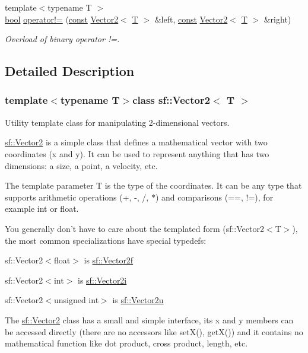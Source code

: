 \begin{DoxyCompactItemize}
{\footnotesize template$<$typename T $>$ }\\\hyperlink{term__entry_8h_a002004ba5d663f149f6c38064926abac}{bool} \hyperlink{classsf_1_1_vector2_a01673da35ef9c52d0e54b8263549a956}{operator!=} (\hyperlink{term__entry_8h_a57bd63ce7f9a353488880e3de6692d5a}{const} \hyperlink{classsf_1_1_vector2}{Vector2}$<$ \hyperlink{curses_8priv_8h_a5ef253115820acf7d27f3c5c3b02a0f0}{T} $>$ \&left, \hyperlink{term__entry_8h_a57bd63ce7f9a353488880e3de6692d5a}{const} \hyperlink{classsf_1_1_vector2}{Vector2}$<$ \hyperlink{curses_8priv_8h_a5ef253115820acf7d27f3c5c3b02a0f0}{T} $>$ \&right)
\begin{DoxyCompactList}\small\item\em Overload of binary operator !=. \end{DoxyCompactList}\end{DoxyCompactItemize}


\subsection{Detailed Description}
\subsubsection*{template$<$typename T$>$class sf\-::\-Vector2$<$ T $>$}

Utility template class for manipulating 2-\/dimensional vectors. 

\hyperlink{classsf_1_1_vector2}{sf\-::\-Vector2} is a simple class that defines a mathematical vector with two coordinates (x and y). It can be used to represent anything that has two dimensions\-: a size, a point, a velocity, etc.

The template parameter T is the type of the coordinates. It can be any type that supports arithmetic operations (+, -\/, /, $\ast$) and comparisons (==, !=), for example int or float.

You generally don't have to care about the templated form (sf\-::\-Vector2$<$\-T$>$), the most common specializations have special typedefs\-: \begin{DoxyItemize}
\item sf\-::\-Vector2$<$float$>$ is \hyperlink{namespacesf_a80cea3c46537294fd1d8d428566ad8b2}{sf\-::\-Vector2f} \item sf\-::\-Vector2$<$int$>$ is \hyperlink{namespacesf_a0eed58bf66694ebbc55f72ca7de840d9}{sf\-::\-Vector2i} \item sf\-::\-Vector2$<$unsigned int$>$ is \hyperlink{namespacesf_a41039649eb65ea7646e2b97cfe124b4f}{sf\-::\-Vector2u}\end{DoxyItemize}
The \hyperlink{classsf_1_1_vector2}{sf\-::\-Vector2} class has a small and simple interface, its x and y members can be accessed directly (there are no accessors like set\-X(), get\-X()) and it contains no mathematical function like dot product, cross product, length, etc.

